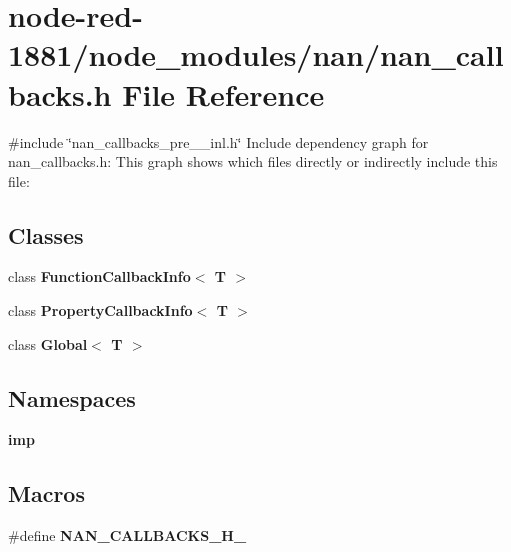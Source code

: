 \section{node-\/red-\/1881/node\+\_\+modules/nan/nan\+\_\+callbacks.h File Reference}
\label{nan__callbacks_8h}
{\ttfamily \#include \char`\"{}nan\+\_\+callbacks\+\_\+pre\+\_\+\_\+inl.\+h\char`\"{}}\newline
Include dependency graph for nan\+\_\+callbacks.\+h\+:
This graph shows which files directly or indirectly include this file\+:
\subsection*{Classes}
\begin{DoxyCompactItemize}
\item 
class \textbf{ Function\+Callback\+Info$<$ T $>$}
\item 
class \textbf{ Property\+Callback\+Info$<$ T $>$}
\item 
class \textbf{ Global$<$ T $>$}
\end{DoxyCompactItemize}
\subsection*{Namespaces}
\begin{DoxyCompactItemize}
\item 
 \textbf{ imp}
\end{DoxyCompactItemize}
\subsection*{Macros}
\begin{DoxyCompactItemize}
\item 
\#define \textbf{ N\+A\+N\+\_\+\+C\+A\+L\+L\+B\+A\+C\+K\+S\+\_\+\+H\+\_\+}
\end{DoxyCompactItemize}
